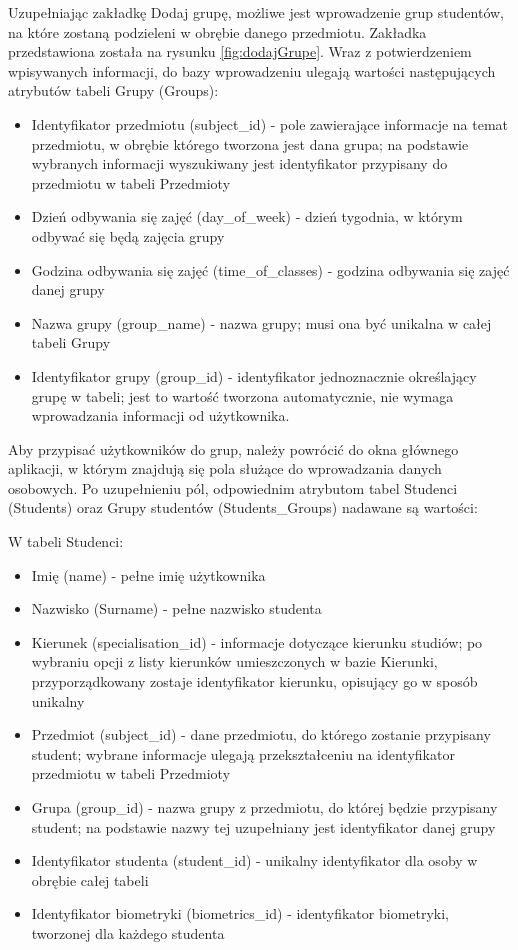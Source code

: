 Uzupełniając zakładkę Dodaj grupę, możliwe jest wprowadzenie grup studentów, na które zostaną podzieleni w obrębie danego przedmiotu. Zakładka przedstawiona została na rysunku \ref{fig:dodajGrupe}. Wraz z potwierdzeniem wpisywanych informacji, do bazy wprowadzeniu ulegają wartości następujących atrybutów tabeli Grupy (Groups):
\begin{itemize}
\item Identyfikator przedmiotu (subject\_id) - pole zawierające informacje na temat przedmiotu, w obrębie którego tworzona jest dana grupa; na podstawie wybranych informacji wyszukiwany jest identyfikator przypisany do przedmiotu w tabeli Przedmioty
\item Dzień odbywania się zajęć (day\_of\_week) - dzień tygodnia, w którym odbywać się będą zajęcia grupy
\item Godzina odbywania się zajęć (time\_of\_classes) - godzina odbywania się zajęć danej grupy
\item Nazwa grupy (group\_name) - nazwa grupy; musi ona być unikalna w całej tabeli Grupy
\item Identyfikator grupy (group\_id) - identyfikator jednoznacznie określający grupę w tabeli; jest to wartość tworzona automatycznie, nie wymaga wprowadzania informacji od użytkownika.
\end{itemize}

Aby przypisać użytkowników do grup, należy powrócić do okna głównego aplikacji, w którym znajdują się pola służące do wprowadzania danych osobowych. Po uzupełnieniu pól, odpowiednim atrybutom tabel Studenci (Students) oraz Grupy studentów (Students\_Groups) nadawane są wartości:

W tabeli Studenci:
\begin{itemize}
\item Imię (name) - pełne imię użytkownika
\item Nazwisko (Surname) - pełne nazwisko studenta
\item Kierunek (specialisation\_id) - informacje dotyczące kierunku studiów; po wybraniu opcji z listy kierunków umieszczonych w bazie Kierunki, przyporządkowany zostaje identyfikator kierunku, opisujący go w sposób unikalny
\item Przedmiot (subject\_id) - dane przedmiotu, do którego zostanie przypisany student; wybrane informacje ulegają przekształceniu na identyfikator przedmiotu w tabeli Przedmioty
\item Grupa (group\_id) - nazwa grupy z przedmiotu, do której będzie przypisany student; na podstawie nazwy tej uzupełniany jest identyfikator danej grupy
\item Identyfikator studenta (student\_id) - unikalny identyfikator dla osoby w obrębie całej tabeli
\item Identyfikator biometryki (biometrics\_id) - identyfikator biometryki, tworzonej dla każdego studenta
\end{itemize}

